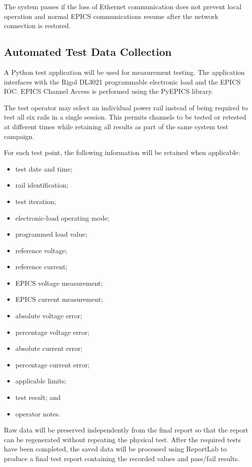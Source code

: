 The system passes if the loss of Ethernet communication does not prevent local
operation and normal EPICS communications resume after the network connection is
restored.

\subsection{Automated Test Data Collection}

A Python test application will be used for measurement testing. The application
interfaces with the Rigol DL3021 programmable electronic load and the EPICS IOC.
EPICS Channel Access is performed using the PyEPICS library.

The test operator may select an individual power rail instead of being required to
test all six rails in a single session. This permits channels to be tested or
retested at different times while retaining all results as part of the same system
test campaign.

For each test point, the following information will be retained when applicable:

\begin{itemize}
	\item test date and time;
	\item rail identification;
	\item test iteration;
	\item electronic-load operating mode;
	\item programmed load value;
	\item reference voltage;
	\item reference current;
	\item EPICS voltage measurement;
	\item EPICS current measurement;
	\item absolute voltage error;
	\item percentage voltage error;
	\item absolute current error;
	\item percentage current error;
	\item applicable limits;
	\item test result; and
	\item operator notes.
\end{itemize}

Raw data will be preserved independently from the final report so that the report
can be regenerated without repeating the physical test. After the required tests
have been completed, the saved data will be processed using ReportLab to produce
a final test report containing the recorded values and pass/fail results.

